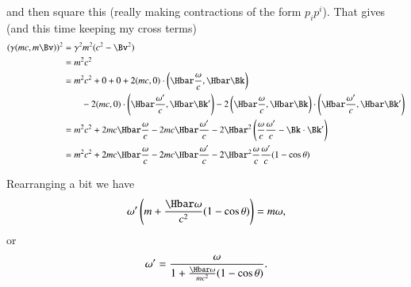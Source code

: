 {and then square this (really making contractions of the form \(p_i p^i\)).  That gives (and this time keeping my cross terms)
%
\begin{equation}\label{eqn:relativisticElectrodynamicsExamReflection:1350}
\begin{aligned}
(\gamma (m c, m \Bv) )^2
&= \gamma^2 m^2 (c^2 - \Bv^2) \\
&= m^2 c^2 \\
&=
m^2 c^2 + 0 + 0
+ 2 (m c, 0)
\cdot \left(\Hbar \frac{\omega}{c}, \Hbar \Bk \right) \\
&\qquad - 2 (m c, 0) \cdot \left(\Hbar \frac{\omega'}{c}, \Hbar \Bk' \right)
- 2
\left(\Hbar \frac{\omega}{c}, \Hbar \Bk \right)
\cdot \left(\Hbar \frac{\omega'}{c}, \Hbar \Bk' \right) \\
&=
m^2 c^2 + 2 m c \Hbar \frac{\omega}{c} - 2 m c \Hbar \frac{\omega'}{c}
- 2\Hbar^2 \left(
\frac{\omega}{c} \frac{\omega'}{c}
-
\Bk \cdot \Bk'
\right) \\
&=
m^2 c^2 + 2 m c \Hbar \frac{\omega}{c} - 2 m c \Hbar \frac{\omega'}{c}
- 2\Hbar^2
\frac{\omega}{c} \frac{\omega'}{c} (1 - \cos\theta)
\end{aligned}
\end{equation}

Rearranging a bit we have
%
\begin{equation}\label{eqn:relativisticElectrodynamicsExamReflection:430}
\omega' \left( m + \frac{\Hbar \omega}{c^2} ( 1 - \cos\theta ) \right) = m \omega,
\end{equation}
or
\begin{equation}\label{eqn:relativisticElectrodynamicsExamReflection:450}
\omega' = \frac{\omega}{
1 + \frac{\Hbar \omega}{m c^2} ( 1 - \cos\theta )
}.
\end{equation}
} %
